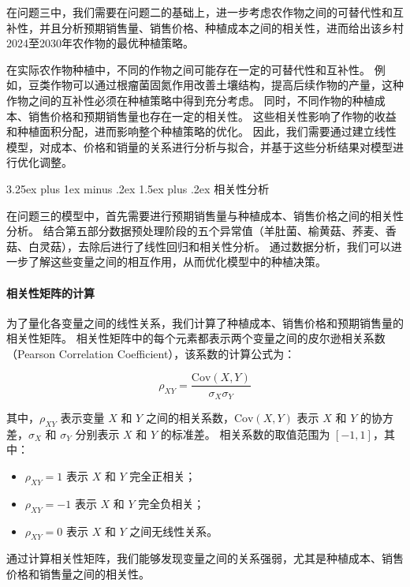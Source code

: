 \documentclass[12pt,a4paper]{nmmcm}
\makeatletter
\renewcommand\subsection{\@startsection{subsection}{2}{0pt}%
    {3.25ex plus 1ex minus .2ex}%
    {1.5ex plus .2ex}%
    {\normalfont\Large\bfseries}}
\makeatother
\begin{document}
在问题三中，我们需要在问题二的基础上，进一步考虑农作物之间的可替代性和互补性，并且分析预期销售量、销售价格、种植成本之间的相关性，进而给出该乡村2024至2030年农作物的最优种植策略。


在实际农作物种植中，不同的作物之间可能存在一定的可替代性和互补性。
例如，豆类作物可以通过根瘤菌固氮作用改善土壤结构，提高后续作物的产量，这种作物之间的互补性必须在种植策略中得到充分考虑。
同时，不同作物的种植成本、销售价格和预期销售量也存在一定的相关性。
这些相关性影响了作物的收益和种植面积分配，进而影响整个种植策略的优化。
因此，我们需要通过建立线性模型，对成本、价格和销量的关系进行分析与拟合，并基于这些分析结果对模型进行优化调整。



\subsection{相关性分析}

在问题三的模型中，首先需要进行预期销售量与种植成本、销售价格之间的相关性分析。
结合第五部分数据预处理阶段的五个异常值（羊肚菌、榆黄菇、荞麦、香菇、白灵菇），去除后进行了线性回归和相关性分析。
通过数据分析，我们可以进一步了解这些变量之间的相互作用，从而优化模型中的种植决策。


\paragraph{相关性矩阵的计算}

为了量化各变量之间的线性关系，我们计算了种植成本、销售价格和预期销售量的相关性矩阵。
相关性矩阵中的每个元素都表示两个变量之间的皮尔逊相关系数（Pearson Correlation Coefficient），该系数的计算公式为：

\[
  \rho_{XY} = \frac{\mathrm{Cov}(X, Y)}{\sigma_X \sigma_Y}
\]

其中，$\rho_{XY}$ 表示变量 $X$ 和 $Y$ 之间的相关系数，$\mathrm{Cov}(X, Y)$ 表示 $X$ 和 $Y$ 的协方差，$\sigma_X$ 和 $\sigma_Y$ 分别表示 $X$ 和 $Y$ 的标准差。
相关系数的取值范围为 $[-1, 1]$，其中：
\begin{itemize}
  \item $\rho_{XY} = 1$ 表示 $X$ 和 $Y$ 完全正相关；
  \item $\rho_{XY} = -1$ 表示 $X$ 和 $Y$ 完全负相关；
  \item $\rho_{XY} = 0$ 表示 $X$ 和 $Y$ 之间无线性关系。

\end{itemize}

通过计算相关性矩阵，我们能够发现变量之间的关系强弱，尤其是种植成本、销售价格和销售量之间的相关性。
\end{document}
